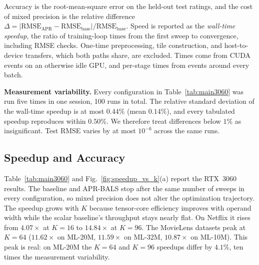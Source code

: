 Accuracy is the root-mean-square error on the held-out test ratings, and the cost of mixed precision is the relative difference $\Delta = |\mathrm{RMSE}_{\mathrm{APR}} - \mathrm{RMSE}_{\mathrm{base}}| / \mathrm{RMSE}_{\mathrm{base}}$. Speed is reported as the \textit{wall-time speedup}, the ratio of training-loop times from the first sweep to convergence, including RMSE checks. One-time preprocessing, tile construction, and host-to-device transfers, which both paths share, are excluded. Times come from CUDA events on an otherwise idle GPU, and per-stage times from events around every batch.

\textbf{Measurement variability.} Every configuration in Table~\ref{tab:main3060} was run five times in one session, 100 runs in total. The relative standard deviation of the wall-time speedup is at most $0.44\%$ (mean $0.14\%$), and every tabulated speedup reproduces within $0.50\%$. We therefore treat differences below $1\%$ as insignificant. Test RMSE varies by at most $10^{-6}$ across the same runs.

\subsection{Speedup and Accuracy}
\label{ssec:main_results}

Table~\ref{tab:main3060} and Fig.~\ref{fig:speedup_vs_k}(a) report the RTX~3060 results. The baseline and APR-BALS stop after the same number of sweeps in every configuration, so mixed precision does not alter the optimization trajectory. The speedup grows with $K$ because tensor-core efficiency improves with operand width while the scalar baseline's throughput stays nearly flat. On Netflix it rises from $4.07\times$ at $K=16$ to $14.84\times$ at $K=96$. The MovieLens datasets peak at $K=64$ ($11.62\times$ on ML-20M, $11.59\times$ on ML-32M, $10.87\times$ on ML-10M). This peak is real: on ML-20M the $K=64$ and $K=96$ speedups differ by $4.1\%$, ten times the measurement variability.

